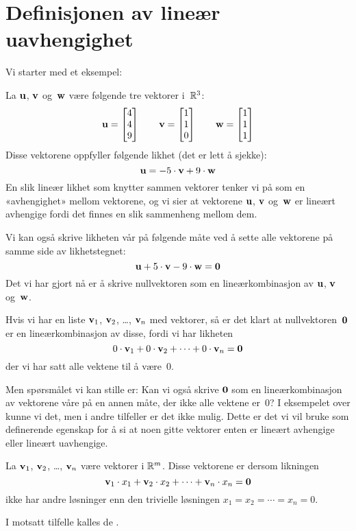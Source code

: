 

\label{ch:linear-uavhengighet}


\section*{Definisjonen av lineær uavhengighet}

Vi starter med et eksempel:

\begin{ex}
\label{ex:lin-uavh-intro}
La $\mathbf{u}$, $\mathbf{v}$ og~$\mathbf{w}$ være følgende tre vektorer i~$\mathbb{R}^3$:
\[
\mathbf{u} = \begin{bmatrix} 4 \\ 4 \\ 9 \end{bmatrix}
\qquad
\mathbf{v} = \begin{bmatrix} 1 \\ 1 \\ 0 \end{bmatrix}
\qquad
\mathbf{w} = \begin{bmatrix} 1 \\ 1 \\ 1 \end{bmatrix}
\]
Disse vektorene oppfyller følgende likhet (det er lett å sjekke):
\[
\mathbf{u} = -5 \cdot \mathbf{v} + 9 \cdot \mathbf{w}
\]
En slik lineær likhet som knytter sammen vektorer tenker vi på som en
«avhengighet» mellom vektorene, og vi sier at vektorene $\mathbf{u}$,
$\mathbf{v}$ og~$\mathbf{w}$ er lineært avhengige fordi det finnes en slik
sammenheng mellom dem.

Vi kan også skrive likheten vår på følgende måte ved å sette alle
vektorene på samme side av likhetstegnet:
\[
\mathbf{u} + 5 \cdot \mathbf{v} - 9 \cdot \mathbf{w} = \mathbf{0}
\]
Det vi har gjort nå er å skrive nullvektoren som en lineærkombinasjon
av $\mathbf{u}$, $\mathbf{v}$ og~$\mathbf{w}$.  
\end{ex}

Hvis vi har en liste $\mathbf{v}_1$, $\mathbf{v}_2$, \ldots, $\mathbf{v}_n$ med
vektorer, så er det klart at nullvektoren~$\mathbf{0}$ er en
lineærkombinasjon av disse, fordi vi har likheten
\[
0 \cdot \mathbf{v}_1 + 0 \cdot \mathbf{v}_2 + \cdots + 0 \cdot \mathbf{v}_n = \mathbf{0}
\]
der vi har satt alle vektene til å være~$0$.

Men spørsmålet vi kan stille er: Kan vi også skrive $\mathbf{0}$ som en
lineærkombinasjon av vektorene våre på en annen måte, der ikke alle
vektene er~$0$?  I eksempelet over kunne vi det, men i andre tilfeller
er det ikke mulig.  Dette er det vi vil bruke som definerende egenskap
for å si at noen gitte vektorer enten er lineært avhengige eller
lineært uavhengige.

\begin{defn}
La $\mathbf{v}_1$, $\mathbf{v}_2$, \ldots, $\mathbf{v}_n$ være vektorer i $\mathbb{R}^m$.
Disse vektorene er  dersom likningen
\[
\mathbf{v}_1 \cdot x_1 + \mathbf{v}_2 \cdot x_2 + \cdots + \mathbf{v}_n \cdot x_n = \mathbf{0}
\]
ikke har andre løsninger enn den trivielle løsningen
$x_1 = x_2 = \cdots = x_n = 0$.

I motsatt tilfelle kalles de .
\end{defn}


